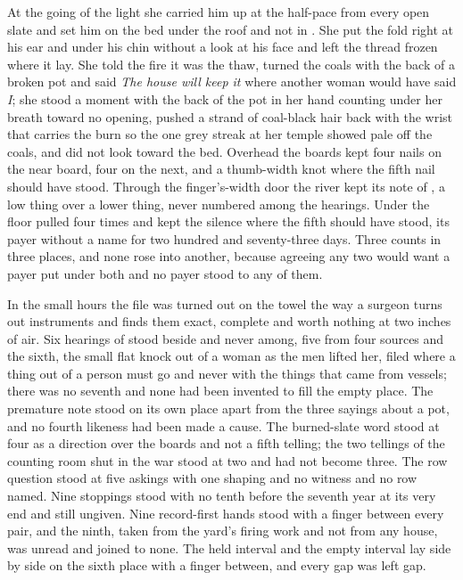 At the going of the light she carried him up at the half-pace from every open slate and set him on the bed under the roof and not in . She put the fold right at his ear and under his chin without a look at his face and left the thread frozen where it lay. She told the fire it was the thaw, turned the coals with the back of a broken pot and said \emph{The house will keep it} where another woman would have said \emph{I}; she stood a moment with the back of the pot in her hand counting under her breath toward no opening, pushed a strand of coal-black hair back with the wrist that carries the burn so the one grey streak at her temple showed pale off the coals, and did not look toward the bed. Overhead the boards kept four nails on the near board, four on the next, and a thumb-width knot where the fifth nail should have stood. Through the finger's-width door the river kept its note of , a low thing over a lower thing, never numbered among the hearings. Under the floor  pulled four times and kept the silence where the fifth should have stood, its payer without a name for two hundred and seventy-three days. Three counts in three places, and none rose into another, because agreeing any two would want a payer put under both and no payer stood to any of them.

\scenebreak

In the small hours the file was turned out on the towel the way a surgeon turns out instruments and finds them exact, complete and worth nothing at two inches of air. Six hearings of  stood beside and never among, five from four sources and the sixth, the small flat knock out of a woman as the men lifted her, filed where a thing out of a person must go and never with the things that came from vessels; there was no seventh and none had been invented to fill the empty place. The premature note stood on its own place apart from the three sayings about a pot, and no fourth likeness had been made a cause. The burned-slate word stood at four as a direction over the boards and not a fifth telling; the two tellings of the counting room shut in the war stood at two and had not become three. The row question stood at five askings with one shaping and no witness and no row named. Nine stoppings stood with no tenth before the seventh year at its very end and still ungiven. Nine record-first hands stood with a finger between every pair, and the ninth, taken from the yard's firing work and not from any house, was unread and joined to none. The held interval and the empty interval lay side by side on the sixth place with a finger between, and every gap was left gap.

